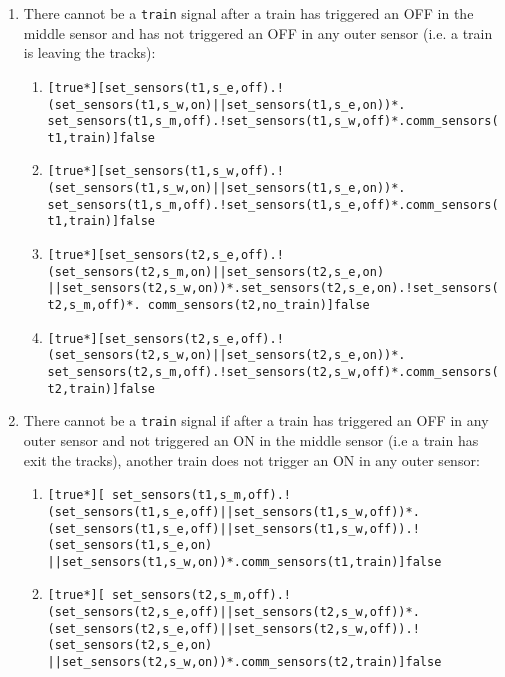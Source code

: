 \documentclass[final]{report}
\begin{document}
\begin{enumerate}
\begin{enumerate}[label=\roman*]
\end{enumerate}

\item There cannot be a \texttt{train} signal after a train has triggered an OFF in the middle sensor and has not triggered an OFF in any outer sensor (i.e. a train is leaving the
tracks):
\begin{enumerate}[label=\roman*]
\item \texttt{[true*][set\_sensors(t1,s\_e,off).!(set\_sensors(t1,s\_w,on)||set\_sensors(t1,s\_e,on))*. set\_sensors(t1,s\_m,off).!set\_sensors(t1,s\_w,off)*.comm\_sensors(t1,train)]false}


\item \texttt{[true*][set\_sensors(t1,s\_w,off).!(set\_sensors(t1,s\_w,on)||set\_sensors(t1,s\_e,on))*. set\_sensors(t1,s\_m,off).!set\_sensors(t1,s\_e,off)*.comm\_sensors(t1,train)]false}

\item \texttt{[true*][set\_sensors(t2,s\_e,off).!(set\_sensors(t2,s\_m,on)||set\_sensors(t2,s\_e,on) ||set\_sensors(t2,s\_w,on))*.set\_sensors(t2,s\_e,on).!set\_sensors(t2,s\_m,off)*. comm\_sensors(t2,no\_train)]false}


\item \texttt{[true*][set\_sensors(t2,s\_e,off).!(set\_sensors(t2,s\_w,on)||set\_sensors(t2,s\_e,on))*. set\_sensors(t2,s\_m,off).!set\_sensors(t2,s\_w,off)*.comm\_sensors(t2,train)]false}

\end{enumerate}

\item There cannot be a \texttt{train} signal if after a train has triggered an OFF in any outer sensor and not triggered an ON in the middle sensor (i.e a train has exit
 the tracks), another train does not trigger an ON in any outer sensor: 
\begin{enumerate}[label=\roman*]
\item \texttt{[true*][ set\_sensors(t1,s\_m,off).!(set\_sensors(t1,s\_e,off)||set\_sensors(t1,s\_w,off))*. (set\_sensors(t1,s\_e,off)||set\_sensors(t1,s\_w,off)).!(set\_sensors(t1,s\_e,on) ||set\_sensors(t1,s\_w,on))*.comm\_sensors(t1,train)]false}

\item \texttt{[true*][ set\_sensors(t2,s\_m,off).!(set\_sensors(t2,s\_e,off)||set\_sensors(t2,s\_w,off))*. (set\_sensors(t2,s\_e,off)||set\_sensors(t2,s\_w,off)).!(set\_sensors(t2,s\_e,on) ||set\_sensors(t2,s\_w,on))*.comm\_sensors(t2,train)]false}
 
\end{enumerate}

\end{enumerate}
\end{document}
